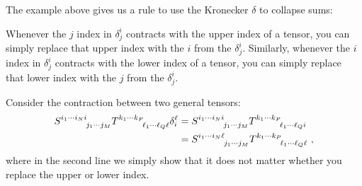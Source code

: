 \documentclass[12pt, oneside]{report}    %
\begin{document}
\begin{subappendices}
The example above gives us a rule to use the Kronecker $\delta$ to collapse sums:
\begin{newrule}
Whenever the $j$ index in $\delta^i_j$ contracts with the upper index of a tensor, you can simply replace that upper index with the $i$ from the $\delta^i_j$. Similarly, whenever the $i$ index in $\delta^i_j$ contracts with the lower index of a tensor, you can simply replace that lower index with the $j$ from the $\delta^i_j$.
\end{newrule}

\begin{example}
Consider the contraction between two general tensors:
\begin{align}
    S\aij{i_1\cdots i_N i}{j_1\cdots j_M} T\aij{k_1\cdots k_P}{\ell_1\cdots \ell_Q \ell}
    \delta^\ell_i &= 
    S\aij{i_1\cdots i_N i}{j_1\cdots j_M} T\aij{k_1\cdots k_P}{\ell_1\cdots \ell_Q i}
    \\
    &=
    S\aij{i_1\cdots i_N \ell}{j_1\cdots j_M} T\aij{k_1\cdots k_P}{\ell_1\cdots \ell_Q \ell}\ ,
\end{align}
where in the second line we simply show that it does not matter whether you replace the upper or lower index.
\end{example}



\end{subappendices}
\end{document}
